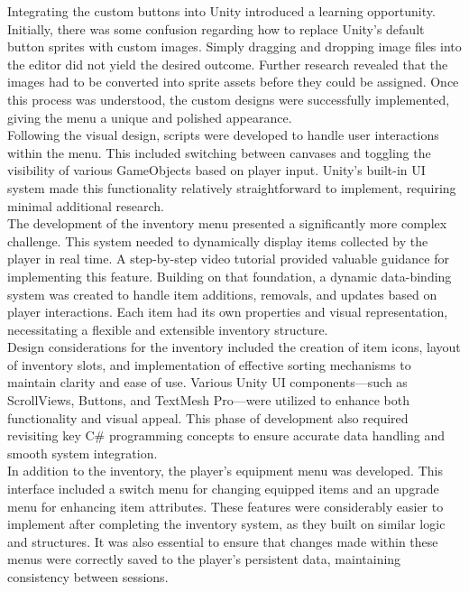 \documentclass{article}
\begin{document}
Integrating the custom buttons into Unity introduced a learning opportunity. Initially, there was some confusion regarding how to replace Unity's default button sprites with custom images. Simply dragging and dropping image files into the editor did not yield the desired outcome. Further research revealed that the images had to be converted into sprite assets before they could be assigned. Once this process was understood, the custom designs were successfully implemented, giving the menu a unique and polished appearance.\\

Following the visual design, scripts were developed to handle user interactions within the menu. This included switching between canvases and toggling the visibility of various GameObjects based on player input. Unity's built-in UI system made this functionality relatively straightforward to implement, requiring minimal additional research.\\

The development of the inventory menu presented a significantly more complex challenge. This system needed to dynamically display items collected by the player in real time. A step-by-step video tutorial provided valuable guidance for implementing this feature. Building on that foundation, a dynamic data-binding system was created to handle item additions, removals, and updates based on player interactions. Each item had its own properties and visual representation, necessitating a flexible and extensible inventory structure.\\

Design considerations for the inventory included the creation of item icons, layout of inventory slots, and implementation of effective sorting mechanisms to maintain clarity and ease of use. Various Unity UI components—such as ScrollViews, Buttons, and TextMesh Pro—were utilized to enhance both functionality and visual appeal. This phase of development also required revisiting key C\# programming concepts to ensure accurate data handling and smooth system integration.\\

In addition to the inventory, the player's equipment menu was developed. This interface included a switch menu for changing equipped items and an upgrade menu for enhancing item attributes. These features were considerably easier to implement after completing the inventory system, as they built on similar logic and structures. It was also essential to ensure that changes made within these menus were correctly saved to the player's persistent data, maintaining consistency between sessions.
\end{document}
